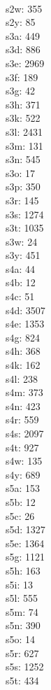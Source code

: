 \begin{multicols}{8}
  \\s2w: 355
  \\s2y: 85
  \\s3a: 449
  \\s3d: 886
  \\s3e: 2969
  \\s3f: 189
  \\s3g: 42
  \\s3h: 371
  \\s3k: 522
  \\s3l: 2431
  \\s3m: 131
  \\s3n: 545
  \\s3o: 17
  \\s3p: 350
  \\s3r: 145
  \\s3s: 1274
  \\s3t: 1035
  \\s3w: 24
  \\s3y: 451
  \\s4a: 44
  \\s4b: 12
  \\s4c: 51
  \\s4d: 3507
  \\s4e: 1353
  \\s4g: 824
  \\s4h: 368
  \\s4k: 162
  \\s4l: 238
  \\s4m: 373
  \\s4n: 423
  \\s4r: 559
  \\s4s: 2097
  \\s4t: 927
  \\s4w: 135
  \\s4y: 689
  \\s5a: 153
  \\s5b: 12
  \\s5c: 26
  \\s5d: 1327
  \\s5e: 1364
  \\s5g: 1121
  \\s5h: 163
  \\s5i: 13
  \\s5l: 555
  \\s5m: 74
  \\s5n: 390
  \\s5o: 14
  \\s5r: 627
  \\s5s: 1252
  \\s5t: 434

\end{multicols}
